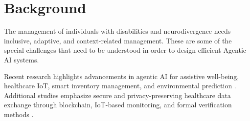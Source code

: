 \documentclass[pdflatex,sn-mathphys-num]{sn-jnl}
\begin{document}
%	
%	
	
\section{Background}

The management of individuals with disabilities and neurodivergence needs inclusive, adaptive, and context-related management. These are some of the special challenges that need to be understood in order to design efficient Agentic AI systems. 

Recent research highlights advancements in agentic AI for assistive well-being, healthcare IoT, smart inventory management, and environmental prediction \cite{jan2025disabilities,syed2025aghealth,syed2025inventory,syed2025cloudburst}. Additional studies emphasize secure and privacy-preserving healthcare data exchange through blockchain, IoT-based monitoring, and formal verification methods \cite{butt2022secure,abutaleb2023integrity,alharbi2024iot,ali2018z}.
\end{document}
